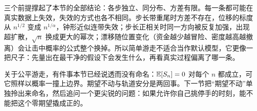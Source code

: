 三个前提撑起了本节的全部结论：各步独立、同分布、方差有限。每一条都可能在真实数据上失效，失效的方式也各不相同。步长带重尾时方差不存在，位移的标度从 \(n^{1/2}\) 变成 \(n^{1/\alpha}\)，钟形近似连带失效；步长正相关时同一方向被反复加强，出现超扩散，\(\sqrt n\) 换成更大的幂次；漂移随位置变化（资金越少越冒险、密度越高越撤离）会让击中概率的公式整个换掉。所以简单游走不适合当作默认模型，它更像一把尺子：先量出在最干净的假设下会发生什么，再看真实过程偏离了哪一条。

关于公平游走，有件事本节已经说透而没有命名：\(\mathbb{E}[S_n]=0\) 对每个 \(n\) 都成立，可它照样以概率一撞上边界。期望不动与轨道安分是两回事。下一节把``期望不动''单独拎出来命名，然后追问一个更尖锐的问题：如果允许你自己挑停手的时刻，能不能把这个零期望撬成正的。
